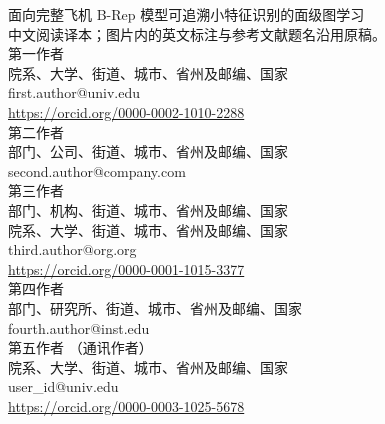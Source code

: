 \documentclass[12pt,a4paper]{ctexart}
\date{}  %
\renewcommand{\abstractname}{摘要}%
\renewcommand{\figurename}{图}%
\renewcommand{\tablename}{表}%
\begin{document}
\renewcommand{\abstractname}{摘要}
\renewcommand{\figurename}{图}
\renewcommand{\tablename}{表}




\begin{center}
{\Huge 面向完整飞机 B-Rep 模型可追溯小特征识别的面级图学习}
\\[1.5ex]
{\small 中文阅读译本；图片内的英文标注与参考文献题名沿用原稿。}
\\[4ex]

{\large 第一作者} \\
{\small
院系、大学、街道、城市、省州及邮编、国家 \\
first.author@univ.edu \\
\url{https://orcid.org/0000-0002-1010-2288}
} \\[1.2em]

{\large 第二作者} \\
{\small
部门、公司、街道、城市、省州及邮编、国家 \\
second.author@company.com
} \\[1.2em]

{\large 第三作者} \\
{\small
部门、机构、街道、城市、省州及邮编、国家 \\
院系、大学、街道、城市、省州及邮编、国家 \\
third.author@org.org \\
\url{https://orcid.org/0000-0001-1015-3377}
} \\[1.2em]

{\large 第四作者} \\
{\small
部门、研究所、街道、城市、省州及邮编、国家 \\
fourth.author@inst.edu
} \\[1.2em]

{\large 第五作者 \small（通讯作者）} \\
{\small
院系、大学、街道、城市、省州及邮编、国家 \\
user\_id@univ.edu \\
\url{https://orcid.org/0000-0003-1025-5678}
}
\end{center}

\begin{abstract}
  B-Rep 几何特征识别是 CAD 编辑与分析的基础。已有研究广泛关注圆角、倒角和孔等由形状定义的特征。在完整飞机的工业仿真场景中，铆钉面和表面特征面的识别同样重要：在固定弦高偏差容差下，其小半径、边界和局部曲率可能引发局部网格加密，增加三角形数量和网格生成时间。去除这些特征时，仍需保持与可编辑 B-Rep 面的关联，以便进行局部曲面重建，并形成更连续的外表面供网格准备使用。本文提出面向铆钉和表面特征识别的面级图学习框架：每个 B-Rep 面对应一个图节点，共享边界定义邻接关系；两个针对不同类别的图神经网络分别学习铆钉和表面特征的判别函数，每条导出的预测均保留原始 B-Rep 面标识符，以支持分阶段处理和结果检查。在包含 34,162 个面的完整测试集上，铆钉和表面特征的 F1 分数分别为 0.9312 和 0.8091。在固定网格设置下，原始模型与简化模型的配对比较表明，表面三角形数量减少 0.57\%--48.66\%，网格生成时间的中位数减少 2.49\%--58.29\%。这些结果记录了测试条件下的面级识别、可追溯的 CAD 处理候选面及配对网格变化；操作层面的完整性、向其他 CAD 来源的迁移能力和仿真响应保持情况仍需进一步验证。
\end{abstract}
\end{document}
